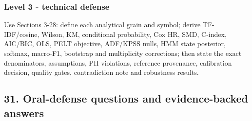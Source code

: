\subsubsection{Level 3 - technical
defense}\label{level-3--technical-defense}

Use Sections 3-28: define each analytical grain and symbol; derive
TF-IDF/cosine, Wilson, KM, conditional probability, Cox HR, SMD,
C-index, AIC/BIC, OLS, PELT objective, ADF/KPSS nulls, HMM state
posterior, softmax, macro-F1, bootstrap and multiplicity corrections;
then state the exact denominators, assumptions, PH violations, reference
provenance, calibration decision, quality gates, contradiction note and
robustness results.

\clearpage

\subsection{31. Oral-defense questions and evidence-backed
answers}\label{31-oral-defense-questions-and-evidence-backed-answers}


